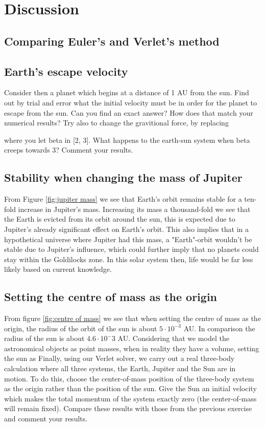 \section{Discussion}
\label{sec:discussion}

\subsection{Comparing Euler's and Verlet's method}

\subsection{Earth's escape velocity}
Consider then a planet which begins at a
distance of 1 AU from the sun. Find out by trial and error what the initial
velocity must be in order for the planet to escape from the sun. Can you find an
exact answer? How does that match your numerical results?
Try also to change the gravitional force, by replacing

where you let beta in [2, 3]. What happens to the earth-sun system when beta creeps
towards 3? Comment your results.


\subsection{Stability when changing the mass of Jupiter}

From Figure \ref{fig:jupiter mass} we see that Earth's orbit remains stable for a
ten-fold increase in Jupiter's mass. Increasing its mass a thousand-fold we see
that the Earth is evicted from its orbit around the sun, this is expected due to
Jupiter's already significant effect on Earth's orbit. This also implies that in a hypothetical universe where Jupiter had this mass, a "Earth"-orbit wouldn't be stable due to Jupiter's influence, which could further imply that no planets could stay within the Goldilocks zone. In this solar system then, life would be far less likely based on current knowledge.

\subsection{Setting the centre of mass as the origin}
From figure \ref{fig:centre of mass} we see that when setting the centre of mass as the origin, the radius of the orbit of the sun is about $5\cdot 10^{-3}$ AU. In comparison the radius of the sun is about $4.6\cdot 10^-3{}$ AU. Considering that we model the astronomical objects as point masses, when in reality they have a volume, setting the sun as
Finally,
using our Verlet solver, we carry out a real three-body calculation where all
three systems, the Earth, Jupiter and the Sun are in motion. To do this, choose
the center-of-mass position of the three-body system as the origin rather than
the position of the sun. Give the Sun an initial velocity which makes the total
momentum of the system exactly zero (the center-of-mass will remain fixed).
Compare these results with those from the previous exercise and comment your
results.

